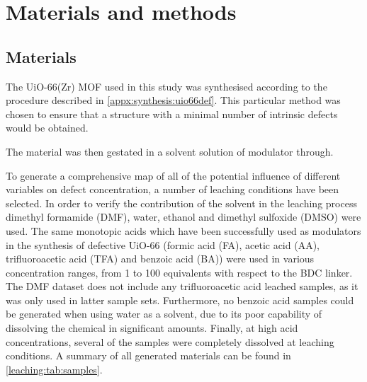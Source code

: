 
\section{Materials and methods}

\subsection{Materials}

The UiO-66(Zr) MOF used in this study was synthesised according
to the procedure described in \autoref{appx:synthesis:uio66def}.
This particular method was chosen to ensure that a structure with
a minimal number of intrinsic defects would be obtained.

The material was then gestated in a solvent solution of modulator
through.

To generate a comprehensive map of all of the potential influence
of different variables on defect concentration, a number of
leaching conditions have been selected. In order to verify the
contribution of the solvent in the leaching process
dimethyl formamide (DMF), water, ethanol and dimethyl sulfoxide (DMSO)
were used. The same monotopic acids which have been successfully used
as modulators in the synthesis of defective UiO-66
(formic acid (FA), acetic acid (AA), trifluoroacetic acid (TFA)
and benzoic acid (BA)) were used in various concentration ranges,
from 1 to 100 equivalents with respect to the BDC linker.
The DMF dataset does not include any trifluoroacetic acid 
leached samples, as it was only used in latter sample sets.
Furthermore, no benzoic acid samples could be generated when using
water as a solvent, due to its poor capability of dissolving the 
chemical in significant amounts. Finally, at high acid concentrations, 
several of the samples were completely dissolved at leaching 
conditions.
A summary of all generated materials can be found in
\autoref{leaching:tab:samples}.

